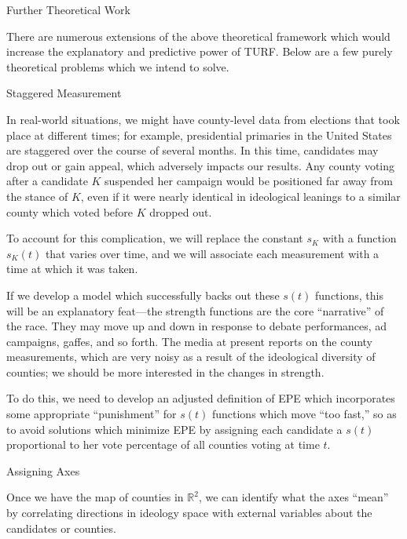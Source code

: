 \documentclass{article}
\begin{document}
\begin{section}{Further Theoretical Work}

There are numerous extensions of the above theoretical framework which would increase the explanatory and predictive power of TURF. Below are a few purely theoretical problems which we intend to solve.

\begin{subsection}{Staggered Measurement}

In real-world situations, we might have county-level data from elections that took place at different times; for example, presidential primaries in the United States are staggered over the course of several months. In this time, candidates may drop out or gain appeal, which adversely impacts our results. Any county voting after a candidate $K$ suspended her campaign would be positioned far away from the stance of $K$, even if it were nearly identical in ideological leanings to a similar county which voted before $K$ dropped out.

To account for this complication, we will replace the constant $s_K$ with a function $s_K(t)$ that varies over time, and we will associate each measurement with a time at which it was taken.

If we develop a model which successfully backs out these $s(t)$ functions, this will be an explanatory feat---the strength functions are the core ``narrative'' of the race. They may move up and down in response to debate performances, ad campaigns, gaffes, and so forth. The media at present reports on the county measurements, which are very noisy as a result of the ideological diversity of counties; we should be more interested in the changes in strength.

To do this, we need to develop an adjusted definition of EPE which incorporates some appropriate ``punishment'' for $s(t)$ functions which move ``too fast,'' so as to avoid solutions which minimize EPE by assigning each candidate a $s(t)$ proportional to her vote percentage of all counties voting at time $t$.

\end{subsection}

\begin{subsection}{Assigning Axes}

Once we have the map of counties in $\mathbb{R}^2$, we can identify what the axes ``mean'' by correlating directions in ideology space with external variables about the candidates or counties.

\end{subsection}


\end{section}
\end{document}
